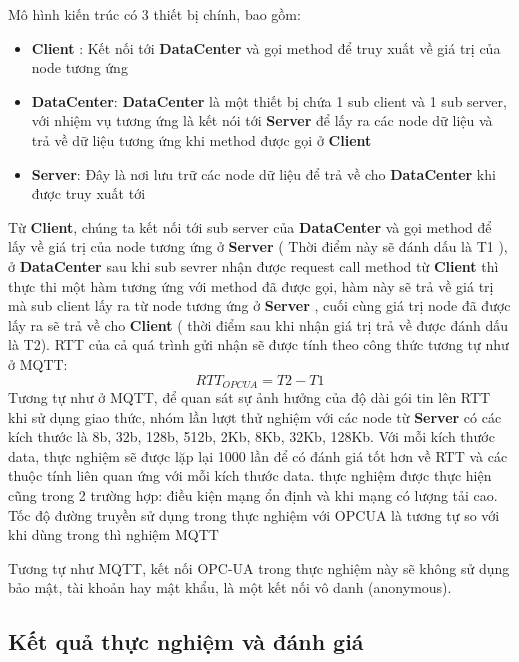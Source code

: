 Mô hình kiến trúc có 3 thiết bị chính, bao gồm:
\begin{itemize}
    \item \textbf{Client} : Kết nối tới \textbf{DataCenter} và gọi method để truy xuất về giá trị của node tương ứng
    \item \textbf{DataCenter}: \textbf{DataCenter} là một thiết bị chứa 1 sub client và 1 sub server, với nhiệm vụ tương ứng là kết nói tới \textbf{Server} để lấy ra các node dữ liệu và trả về dữ liệu tương ứng khi method được gọi ở \textbf{Client}
    \item \textbf{Server}: Đây là nơi lưu trữ các node dữ liệu để trả về cho \textbf{DataCenter} khi được truy xuất tới
\end{itemize}

Từ \textbf{Client}, chúng ta kết nối tới sub server của \textbf{DataCenter} và gọi method để lấy về giá trị của node tương ứng ở \textbf{Server} ( Thời điểm này sẽ đánh dấu là T1 ), ở \textbf{DataCenter} sau khi sub sevrer nhận được request call method từ \textbf{Client} thì thực thi một hàm tương ứng với method đã được gọi, hàm này sẽ trả về giá trị mà sub client lấy ra từ node tương ứng ở \textbf{Server} , cuối cùng giá trị node đã được lấy ra sẽ trả về cho \textbf{Client} ( thời điểm sau khi nhận giá trị trả về được đánh dấu là T2). RTT của cả quá trình gửi nhận sẽ được tính theo công thức tương tự như ở MQTT:
\begin{equation}
    RTT_{OPCUA} = T2 - T1
\end{equation}
Tương tự như ở MQTT, để quan sát sự ảnh hưởng của độ dài gói tin lên RTT khi sử dụng giao
thức, nhóm lần lượt thử nghiệm với các node từ \textbf{Server} có các kích thước là
8b, 32b, 128b, 512b, 2Kb, 8Kb, 32Kb, 128Kb. Với mỗi kích thước data, thực nghiệm sẽ được lặp lại 1000 lần để có đánh giá tốt hơn về RTT và các thuộc tính liên quan ứng với mỗi kích thước data. thực nghiệm được thực hiện cũng trong 2 trường hợp: điều kiện mạng ổn định và khi mạng có lượng tải cao. Tốc độ đường truyền sử dụng trong thực nghiệm với OPCUA là tương tự so với khi dùng trong thì nghiệm  MQTT

Tương tự như MQTT, kết nối OPC-UA trong thực nghiệm này sẽ không sử dụng bảo mật, tài khoản hay mật khẩu, là một kết nối vô danh (anonymous).

\subsection{Kết quả thực nghiệm và đánh giá}

